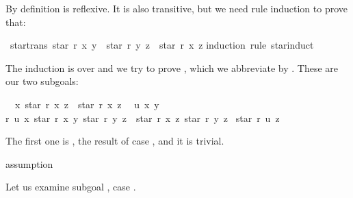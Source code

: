 \begin{isabellebody}
\begin{isamarkuptext}
By definition  is reflexive. It is also transitive, but we
need rule induction to prove that:%
\end{isamarkuptext}%
\isamarkuptrue%
\isamarkupfalse%
\ star{}trans{}\ {}star\ r\ x\ y\ {}\ star\ r\ y\ z\ {}\ star\ r\ x\ z{}\isanewline
%
\isadelimproof
%
\endisadelimproof
%
\isatagproof
{}\isamarkupfalse%
{}induction\ rule{}\ star{}induct{}%
\begin{isamarkuptxt}%
The induction is over  and we try to prove
\mbox{},
which we abbreviate by . These are our two subgoals:
\begin{isabelle}%
\ {}{}\ {}x{}\ star\ r\ x\ z\ {}\ star\ r\ x\ z\isanewline
\ {}{}\ {}u\ x\ y{}\isanewline
{}r\ u\ x{}\ star\ r\ x\ y{}\ star\ r\ y\ z\ {}\ star\ r\ x\ z{}\ star\ r\ y\ z{}\isanewline
{}\ star\ r\ u\ z%
\end{isabelle}
The first one is , the result of case ,
and it is trivial.%
\end{isamarkuptxt}%
\isamarkuptrue%
\isamarkupfalse%
{}assumption{}%
\begin{isamarkuptxt}%
Let us examine subgoal , case .

\end{isamarkuptxt}
\end{isabellebody}
